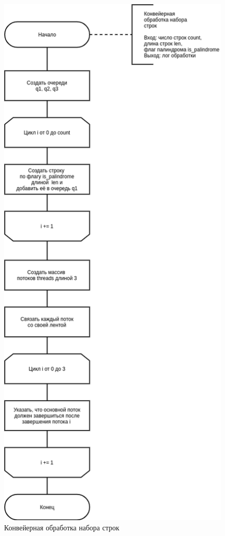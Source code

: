 \begin{figure}[H]
	\begin{center}
		\includegraphics[scale=0.5]{img/threads.png}
	\end{center}
	\captionsetup{justification=centering}
	\caption{Конвейерная обработка набора строк}
	\label{img:threads}
\end{figure}

